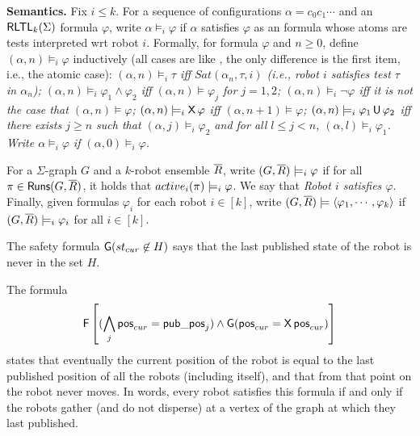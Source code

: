 {\bf Semantics.} Fix $i \leq k$. For a sequence of configurations $\alpha = c_0 c_1 \cdots$ and an $\textsf{RLTL}_k(\Sigma)$ formula $\varphi$, write
$\alpha \models_i \varphi$ if $\alpha$ satisfies $\varphi$ as an \LTL formula whose atoms are tests interpreted wrt robot $i$.
Formally, for formula $\varphi$ and $n \geq 0$, define $(\alpha,n) \models_i \varphi$ inductively (all cases are like \LTL, the only difference is
the first item, i.e., the atomic case):
	\it
	\- $(\alpha,n) \models_i \tau$ iff $Sat(\alpha_n,\tau,i)$ (i.e., robot $i$ satisfies test $\tau$ in $\alpha_n$);
	\- $(\alpha,n) \models_i \varphi_1 \wedge \varphi_2$ iff $(\alpha,n) \models \varphi_j$ for $j = 1,2$;
	\-	$(\alpha,n) \models_i \neg \varphi$ iff it is not the case that $(\alpha,n) \models \varphi$;
	\-  $(\alpha,n) \models_i \operatorname{\mathsf{X}} \varphi$ iff $(\alpha,n+1) \models \varphi$;
	\- $(\alpha,n) \models_i \varphi_1 \operatorname{\mathbin{\mathsf{U}}} \varphi_2$ iff there exists $j \geq n$ such that $(\alpha,j) \models_i \varphi_2$ and for all $l \leq j < n$, $(\alpha,l) \models_i \varphi_1$.
	\ti
	Write $\alpha \models_i \varphi$ if $(\alpha,0) \models_i \varphi$.

For a $\Sigma$-graph $G$ and a $k$-robot ensemble $\overline{R}$, write $(G,\overline{R}) \models_i \varphi$ if for all $\pi \in \mathsf{Runs}(G,\overline{R})$,
it holds that $active_i(\pi) \models_i \varphi$. We say that \emph{Robot $i$ satisfies $\varphi$}.
Finally, given \RLTL formulas $\varphi_i$ for each robot $i \in [k]$, write $(G,\overline{R}) \models \langle {\varphi_1,\cdots,\varphi_k} \rangle$ if $(G,\overline{R}) \models_i \varphi_i$ for all $i \in [k]$.





\begin{example}
The \RLTL safety formula $\operatorname{\mathsf{G}}  (st_{cur} \not \in H)$ says that the last published state of the robot is never in the set $H$.
\end{example}

\begin{example}[gather]
The \RLTL formula 
\[ \operatorname{\mathsf{F}}\left[ (\bigwedge_j \mathsf{pos}_{cur} = \mathsf{pub\_pos}_j) \wedge \operatorname{\mathsf{G}} (\mathsf{pos}_{cur} = \operatorname{\mathsf{X}} \mathsf{pos}_{cur})\right] 
\]
 states that eventually
the current position of the robot is equal to the last published position of all the robots (including itself), and that from that point on the robot never moves.
In words, every robot satisfies this formula if and only if the robots gather (and do not disperse) at a vertex of the graph at which they last published. %
\end{example}

